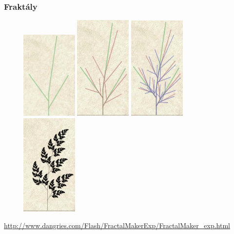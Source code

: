 \begin{frame}
\frametitle{Fraktály}
	\begin{figure}[h]
		\includegraphics[width=2.8cm,keepaspectratio]{pics/procedural/weed0.jpg}
		\includegraphics[width=2.8cm,keepaspectratio]{pics/procedural/weed1.jpg}
		\includegraphics[width=2.8cm,keepaspectratio]{pics/procedural/weed2.jpg}
		\includegraphics[width=2.8cm,keepaspectratio]{pics/procedural/weed3.jpg}
	\end{figure}
	\url{http://www.dangries.com/Flash/FractalMakerExp/FractalMaker_exp.html}
\end{frame}

